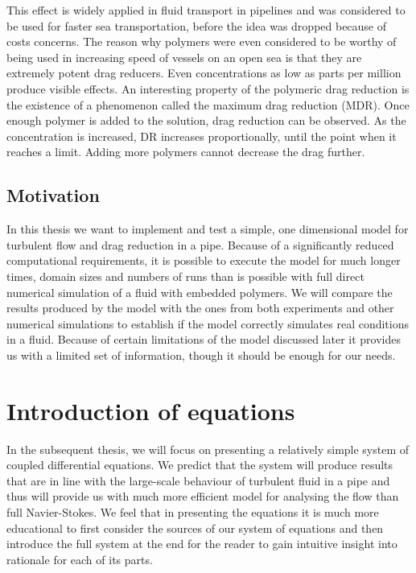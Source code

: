 \documentclass[11pt,a4paper]{article}
\begin{document}
This effect is widely applied in fluid transport in pipelines\cite{Graham04} and was considered to be used for faster sea transportation\cite{Dimotakis03}, before the idea was dropped because of costs concerns.
The reason why polymers were even considered to be worthy of being used in increasing speed of vessels on an open sea is that they are extremely potent drag reducers.
Even concentrations as low as parts per million produce visible effects.
An interesting property of the polymeric drag reduction is the existence of a phenomenon called the maximum drag reduction (MDR).
Once enough polymer is added to the solution, drag reduction can be observed.
As the concentration is increased, DR increases proportionally, until the point when it reaches a limit.
Adding more polymers cannot decrease the drag further.

\subsection{Motivation}
In this thesis we want to implement and test a simple, one dimensional model for turbulent flow and drag reduction in a pipe.
Because of a significantly reduced computational requirements, it is possible to execute the model for much longer times, domain sizes and numbers of runs than is possible with full direct numerical simulation of a fluid with embedded polymers.
We will compare the results produced by the model with the ones from both experiments and other numerical simulations to establish if the model correctly simulates real conditions in a fluid.
Because of certain limitations of the model discussed later it provides us with a limited set of information, though it should be enough for our needs.

\section{Introduction of equations}
In the subsequent thesis, we will focus on presenting a relatively simple system of coupled differential equations.
We predict that the system will produce results that are in line with the large-scale behaviour of turbulent fluid in a pipe and thus will provide us with much more efficient model for analysing the flow than full Navier-Stokes.
We feel that in presenting the equations it is much more educational to first consider the sources of our system of equations and then introduce the full system at the end for the reader to gain intuitive insight into rationale for each of its parts.
\end{document}

